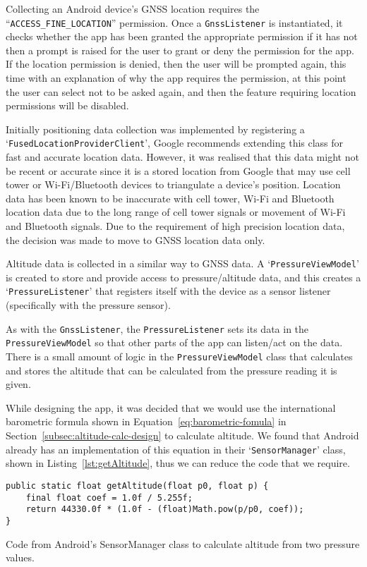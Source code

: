 Collecting an Android device's GNSS location requires the ``\texttt{ACCESS\_FINE\_LOCATION}'' permission. Once a \texttt{GnssListener} is instantiated, it checks whether the app has been granted the appropriate permission if it has not then a prompt is raised for the user to grant or deny the permission for the app. If the location permission is denied, then the user will be prompted again, this time with an explanation of why the app requires the permission, at this point the user can select not to be asked again, and then the feature requiring location permissions will be disabled.

Initially positioning data collection was implemented by registering a `\texttt{FusedLocationProvider\-Client}', Google recommends extending this class for fast and accurate location data. However, it was realised that this data might not be recent or accurate since it is a stored location from Google that may use cell tower or Wi-Fi/Bluetooth devices to triangulate a device's position. Location data has been known to be inaccurate with cell tower, Wi-Fi and Bluetooth location data due to the long range of cell tower signals or movement of Wi-Fi and Bluetooth signals. Due to the requirement of high precision location data, the decision was made to move to GNSS location data only.

Altitude data is collected in a similar way to GNSS data. A `\texttt{PressureViewModel}' is created to store and provide access to pressure/altitude data, and this creates a `\texttt{PressureListener}' that registers itself with the device as a sensor listener (specifically with the pressure sensor).

As with the \texttt{GnssListener}, the \texttt{PressureListener} sets its data in the \texttt{PressureViewModel} so that other parts of the app can listen/act on the data. There is a small amount of logic in the \texttt{PressureViewModel} class that calculates and stores the altitude that can be calculated from the pressure reading it is given.

  While designing the app, it was decided that we would use the international barometric formula shown in Equation~\ref{eq:barometric-fomula} in Section~\ref{subsec:altitude-calc-design} to calculate altitude. We found that Android already has an implementation of this equation in their `\texttt{SensorManager}' class, shown in Listing~\vref{lst:getAltitude}, thus we can reduce the code that we require.

\begin{listing}
  \centering
  \begin{verbatim}
public static float getAltitude(float p0, float p) {
    final float coef = 1.0f / 5.255f;
    return 44330.0f * (1.0f - (float)Math.pow(p/p0, coef));
}
  \end{verbatim}
  \caption{Code from Android's SensorManager class to calculate altitude from two pressure values.~\cite{_android_????-1}}\label{lst:getAltitude}
\end{listing}

